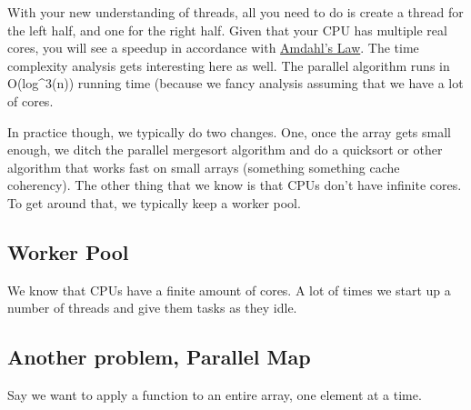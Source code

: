 \begin{Shaded}
\begin{Highlighting}[]
  
     \NormalTok{)\{}
     \NormalTok{\}}
\end{Highlighting}
\end{Shaded}

With your new understanding of threads, all you need to do is create a
thread for the left half, and one for the right half. Given that your
CPU has multiple real cores, you will see a speedup in accordance with
\href{https://en.wikipedia.org/wiki/Amdahl's_law}{Amdahl's Law}. The
time complexity analysis gets interesting here as well. The parallel
algorithm runs in O(log\^{}3(n)) running time (because we fancy analysis
assuming that we have a lot of cores.

In practice though, we typically do two changes. One, once the array
gets small enough, we ditch the parallel mergesort algorithm and do a
quicksort or other algorithm that works fast on small arrays (something
something cache coherency). The other thing that we know is that CPUs
don't have infinite cores. To get around that, we typically keep a
worker pool.

\subsection{Worker Pool}\label{worker-pool}

We know that CPUs have a finite amount of cores. A lot of times we start
up a number of threads and give them tasks as they idle.

\subsection{Another problem, Parallel
Map}\label{another-problem-parallel-map}

Say we want to apply a function to an entire array, one element at a
time.

\begin{Shaded}
\begin{Highlighting}[]

  \NormalTok{), } 
     
     
\NormalTok{\}}
\end{Highlighting}
\end{Shaded}

